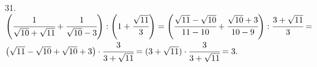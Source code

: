 31. $\left(\cfrac{1}{\sqrt{10}+\sqrt{11}}+\cfrac{1}{\sqrt{10}-3}\right):\left(1+\cfrac{\sqrt{11}}{3}\right)=
\left(\cfrac{\sqrt{11}-\sqrt{10}}{11-10}+\cfrac{\sqrt{10}+3}{10-9}\right):\cfrac{3+\sqrt{11}}{3}=$\\$
\left(\sqrt{11}-\sqrt{10}+\sqrt{10}+3\right)\cdot\cfrac{3}{3+\sqrt{11}}=
(3+\sqrt{11})\cdot\cfrac{3}{3+\sqrt{11}}=3.$\\
